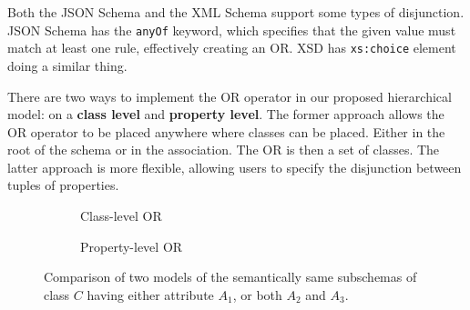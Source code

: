 Both the JSON Schema and the XML Schema support some types of disjunction. JSON Schema has the {\tt anyOf} keyword, which specifies that the given value must match at least one rule, effectively creating an OR. XSD has {\tt xs:choice} element doing a similar thing.

There are two ways to implement the OR operator in our proposed hierarchical model: on a \textbf{class level} and \textbf{property level}. The former approach allows the OR operator to be placed anywhere where classes can be placed. Either in the root of the schema or in the association. The OR is then a set of classes. The latter approach is more flexible, allowing users to specify the disjunction between tuples of properties.

\begin{figure}[h!]\centering
  \begin{subfigure}[b]{.5\textwidth}
    \centering
    \caption{Class-level OR}
    \end{subfigure}%
    \begin{subfigure}[b]{.5\textwidth}
    \centering
    \caption{Property-level OR}
    \end{subfigure}%
  \caption{Comparison of two models of the semantically same subschemas of class $C$ having either attribute $A_1$, or both $A_2$ and $A_3$.}
\end{figure}

